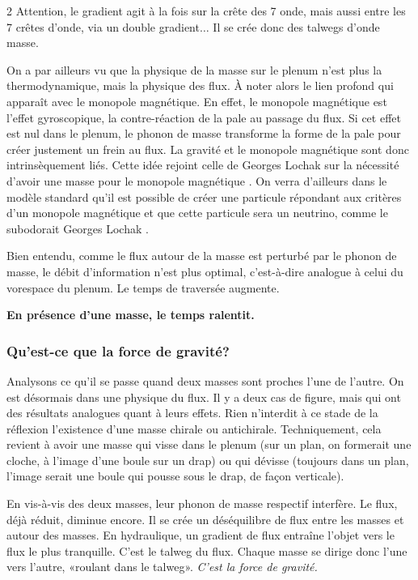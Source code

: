 \begin{multicols}{2}
Attention, le gradient agit à la fois sur la crête des 7 onde,
mais aussi entre les 7 crêtes d'onde, via un double gradient$\ldots$ Il se
crée donc des talwegs d'onde masse.

On a par ailleurs vu que la physique de la masse sur le plenum n'est
plus la thermodynamique, mais la physique des flux. À noter alors le lien
profond qui apparaît avec le monopole magnétique. En effet, le
monopole magnétique est l'effet gyroscopique, la contre-réaction de la
pale au passage du flux. Si cet effet est nul dans le plenum, le
phonon de masse transforme la forme de la pale pour créer justement un
frein au flux. La gravité et le monopole magnétique sont donc
intrinsèquement liés. Cette idée rejoint celle de Georges Lochak sur
la nécessité d'avoir une masse pour le monopole magnétique \cite{lochak2002monopole}. On verra
d'ailleurs dans le modèle standard qu'il est possible de créer une
particule répondant aux critères d'un monopole magnétique et
que cette particule sera un neutrino, comme le
subodorait Georges Lochak \cite{lochak2002monopole}.

Bien entendu, comme le flux autour de la masse est perturbé par le
phonon de masse, le débit d'information n'est plus optimal,
c'est-à-dire analogue à celui du vorespace du plenum. Le temps de
traversée augmente.
\medskip

\textbf{En présence d'une masse, le temps ralentit.}

\subsubsection*{Qu'est-ce que la force de gravité?}

Analysons ce qu'il se passe quand deux masses sont proches l'une de
l'autre. On est désormais dans une physique du flux. Il y a deux cas
de figure, mais qui ont des résultats analogues quant à leurs effets.
Rien n'interdit à ce stade de la réflexion l'existence d'une masse
chirale ou antichirale. Techniquement, cela revient à avoir
une masse qui visse dans le plenum (sur un plan, on formerait une
cloche, à l'image d'une boule sur un drap) ou qui dévisse (toujours
dans un plan, l'image serait une boule qui pousse sous le drap, de
façon verticale).

En vis-à-vis des deux masses, leur phonon de masse respectif
interfère. Le flux, déjà réduit, diminue encore. Il se crée un
déséquilibre de flux entre les masses et autour des
masses. En hydraulique, un gradient de flux entraîne l'objet vers le
flux le plus tranquille. C'est le talweg du flux. Chaque masse se
dirige donc l'une vers l'autre, «roulant dans le talweg». \textit{C'est la
force de gravité.}


\end{multicols}
